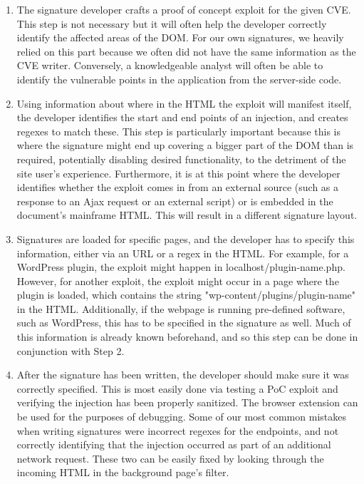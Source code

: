 \begin{enumerate}
	\item{
The signature developer crafts a proof of concept exploit for the given CVE. This step is not necessary but it will often help the developer correctly identify the affected areas of the DOM. For our own signatures, we heavily relied on this part because we often did not have the same information as the CVE writer.
Conversely, a knowledgeable analyst will often be able to identify the vulnerable points in the application from the server-side code.}
\item
Using information about where in the HTML the exploit will manifest itself, the developer identifies the start and end points of an injection, and creates regexes to match these. This step is particularly important because this is where the signature might end up covering a bigger part of the DOM than is required, potentially disabling desired functionality, to the detriment of the site user's experience. Furthermore, it is at this point where the developer identifies whether the exploit comes in from an external source (such as a response to an Ajax request or an external script) or is embedded in the document's mainframe HTML. This will result in a different signature layout. 
\item
Signatures are loaded for specific pages, and the developer has to specify this information, either via an URL or a regex in the HTML. For example, for a WordPress plugin, the exploit might happen in localhost/plugin-name.php. However, for another exploit, the exploit might occur in a page where the plugin is loaded, which contains the string "wp-content/plugins/plugin-name" in the HTML. Additionally, if the webpage is running pre-defined software, such as WordPress, this has to be specified in the signature as well. Much of this information is already known beforehand, and so this step can be done in conjunction with Step 2.
\item
After the signature has been written, the developer should make sure it was correctly specified. This is most easily done via testing a PoC exploit and verifying the injection has been properly sanitized. The browser extension can be used for the purposes of debugging. Some of our most common mistakes when writing signatures were incorrect regexes for the endpoints, and not correctly identifying that the injection occurred as part of an additional network request. These two can be easily fixed by looking through the incoming HTML in the background page's filter. 
\end{enumerate}

